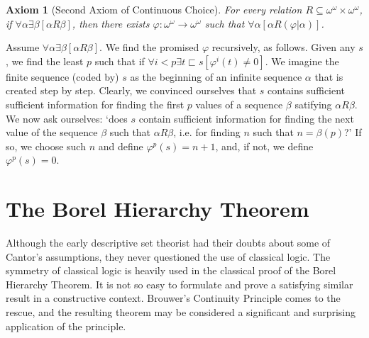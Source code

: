 \documentclass[a4paper]{amsart}
\theoremstyle{plain}
\newtheorem{axiom}{Axiom}
\begin{document}
\begin{axiom}[Second Axiom of Continuous Choice]\label{ax:secondacc} For every relation $R\subseteq \omega^\omega\times \omega^\omega$,\\ if $\forall \alpha \exists \beta[\alpha R \beta]$, then there exists $\varphi:\omega^\omega\rightarrow \omega^\omega$ such that $\forall \alpha[\alpha R (\varphi|\alpha)]$.  \end{axiom}

Assume $\forall \alpha\exists \beta[\alpha R \beta]$. We find the promised $\varphi$ recursively, as follows. Given any $s$, we find the least $p$ such that  if $\forall i<p\exists t\sqsubset s[\varphi^i (t)\neq 0]$. We imagine the finite sequence (coded by) $s$ as the beginning of an infinite sequence $\alpha$ that is created step by step. Clearly, we convinced ourselves that $s$ contains sufficient sufficient information for finding the first $p$ values of a sequence $\beta$ satifying $\alpha R \beta$.  We now ask ourselves: `does $s$ contain sufficient information for finding the next value of the sequence $\beta$ such that $\alpha R\beta$, i.e. for finding $n$ such that $n =\beta(p)$?'  If so, we choose such $n$ and define $\varphi^p(s)=n+1$, and, if not, we define $\varphi^p(s) =0$. 





\section{The Borel Hierarchy Theorem}\label{S:bht}

Although the early descriptive set theorist had their doubts about some of Cantor's assumptions, they never questioned the use of classical logic.
The symmetry of classical logic is heavily used in the classical proof of the Borel Hierarchy Theorem. It is not so easy to formulate and prove a satisfying similar result in a constructive context.   Brouwer's Continuity Principle comes to the rescue, and the resulting theorem may be considered a significant and surprising application of the principle.
\end{document}
